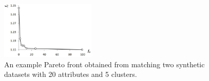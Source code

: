 \begin{figure}[tb]
\begin{center}
\includegraphics[width=0.4\textwidth]{fig/syn_pareto.eps}
\end{center}
\caption[An example Pareto front result from the synthetic dataset]{\label{fig:syn_pareto} An example Pareto front obtained from matching two synthetic datasets with 20 attributes and 5 clusters.}
\end{figure}

